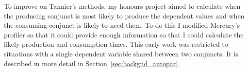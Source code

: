 To improve on Tannier's methods,
my honours project
\citep*{bone:2008:hons}
aimed to calculate when the
producing conjunct is most likely to produce the dependent values and
when the consuming conjunct is likely to need them.
To do this I modified Mercury's profiler so that it could provide enough
information so that I could calculate the likely production and
consumption times.
This early work was restricted to situations with a
single dependent variable shared between two conjuncts.
It is described in more detail in Section~\ref{sec:backgnd_autopar}.

